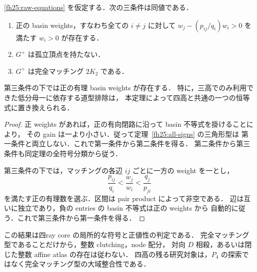 \begin{corollary}[三高・四高の統一された完全マッチング判定]
\label{fh25:matching}
\eqref{fh25:raw-equations} を仮定する．次の三条件は同値である．
\begin{enumerate}
 \item 正の basin weights，すなわち全ての $i\ne j$ に対して
 $w_j-(p_{ij}/q_i)w_i>0$ を満たす $w_i>0$ が存在する．
 \item $G^+$ は孤立頂点を持たない．
 \item $G^+$ は完全マッチング $2K_2$ である．
\end{enumerate}
第三条件の下では正の有理 basin weights が存在する．
特に，三高でのみ利用できた低分母一に依存する道型排除は，
本定理によって四高と共通の一つの恒等式に置き換えられる．
\end{corollary}

\begin{proof}
正 weights があれば，正の有向閉路に沿って basin 不等式を掛けることにより，
その gain は一より小さい．従って定理~\ref{fh25:all-signs} の三角形型は
第一条件と両立しない．これで第一条件から第二条件を得る．
第二条件から第三条件も同定理の全符号分類から従う．

第三条件の下では，マッチングの各辺 $ij$ ごとに一方の weight を一とし，
\[
 \frac{p_{ij}}{q_i}<\frac{w_j}{w_i}<\frac{q_j}{p_{ji}}
\]
を満たす正の有理数を選ぶ．区間は pair product によって非空である．
辺は互いに独立であり，負の entries の basin 不等式は正の weights から
自動的に従う．これで第三条件から第一条件を得る．
\end{proof}

\begin{remark}[大域問題との区別]
この結果は四ray core の局所的な符号と正値性の判定である．
完全マッチング型であることだけから，整数 clutching，node 配分，
対向 $D$ 相殺，あるいは閉じた整数 affine atlas の存在は従わない．
四高の残る研究対象は，$P_4$ の探索ではなく完全マッチング型の大域整合性である．
\end{remark}

